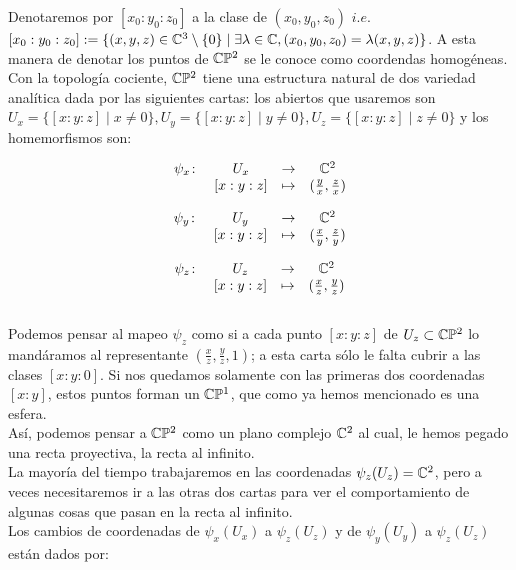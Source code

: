 Denotaremos por $[x_{0}:y_{0}:z_{0}]$ a la clase de $(x_{0},y_{0},z_{0})$ $\mathit{i.e.}$ $[x_{0}:y_{0}:z_{0}]:=\{(x,y,z)\in\mathbb{C}^{3}\setminus\{0\} \mid \exists\lambda\in\mathbb{C},(x_{0},y_{0},z_{0})=\lambda (x,y,z)\}$. A esta manera de denotar los puntos de $\mathbb{C}\mathbb{P}^2$ se le conoce como coordendas homogéneas.\\

Con la topología cociente, $\mathbb{C}\mathbb{P}^2$ tiene una estructura natural de  dos variedad analítica dada por las siguientes cartas: los abiertos que usaremos son $U_{x}=\{[x:y:z] \mid x\neq 0\},U_{y}=\{[x:y:z] \mid y\neq 0\},U_{z}=\{[x:y:z] \mid z\neq 0\}$ y los homemorfismos son:

$$
\begin{matrix}
\psi_{x} \colon & U_{x} &  \rightarrow & \mathbb{C}^{2}\\
& [x:y:z] &  \mapsto &  (\frac{y}{x},\frac{z}{x})
\end{matrix}
$$

$$
\begin{matrix}
\psi_{y} \colon & U_{y} &  \rightarrow & \mathbb{C}^{2}\\
& [x:y:z] &  \mapsto &  (\frac{x}{y},\frac{z}{y})
\end{matrix}
$$

$$
\begin{matrix}
\psi_{z} \colon & U_{z} &  \rightarrow & \mathbb{C}^{2}\\
& [x:y:z] &  \mapsto &  (\frac{x}{z},\frac{y}{z})
\end{matrix}
$$\\

Podemos pensar al mapeo $\psi_{z}$ como si a cada punto $[x:y:z]$ de $U_{z}\subset\mathbb{C}\mathbb{P}^2$ lo mandáramos al representante $(\tfrac{x}{z},\tfrac{y}{z},1)$; a esta carta sólo le falta cubrir a las clases $[x:y:0]$. Si nos quedamos solamente con las primeras dos coordenadas $[x:y]$, estos puntos forman un $\mathbb{C}\mathbb{P}^{1}$, que como ya hemos mencionado es una esfera.\\

Así, podemos pensar a $\mathbb{C}\mathbb{P}^2$ como un plano complejo $\mathbb{C}^{2}$ al cual, le hemos pegado una recta proyectiva, la recta al infinito.\\ 
 
La mayoría del tiempo trabajaremos en las coordenadas $\psi_{z}(U_{z})=\mathbb{C}^{2}$, pero a veces necesitaremos ir a las otras dos cartas para ver el comportamiento de algunas cosas que pasan en la recta al infinito.\\

Los cambios de coordenadas de $\psi_{x}(U_{x})$ a $\psi_{z}(U_{z})$ y de $\psi_{y}(U_{y})$ a $\psi_{z}(U_{z})$ están dados por:

